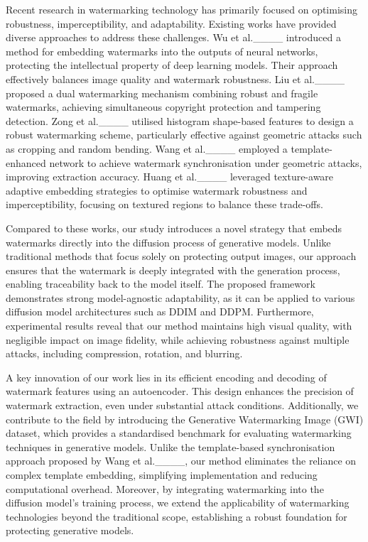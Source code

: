 Recent research in watermarking technology has primarily focused on optimising robustness, imperceptibility, and adaptability. Existing works have provided diverse approaches to address these challenges. Wu et al.____ introduced a method for embedding watermarks into the outputs of neural networks, protecting the intellectual property of deep learning models. Their approach effectively balances image quality and watermark robustness. Liu et al.____ proposed a dual watermarking mechanism combining robust and fragile watermarks, achieving simultaneous copyright protection and tampering detection. Zong et al.____ utilised histogram shape-based features to design a robust watermarking scheme, particularly effective against geometric attacks such as cropping and random bending. Wang et al.____ employed a template-enhanced network to achieve watermark synchronisation under geometric attacks, improving extraction accuracy. Huang et al.____ leveraged texture-aware adaptive embedding strategies to optimise watermark robustness and imperceptibility, focusing on textured regions to balance these trade-offs.

Compared to these works, our study introduces a novel strategy that embeds watermarks directly into the diffusion process of generative models. Unlike traditional methods that focus solely on protecting output images, our approach ensures that the watermark is deeply integrated with the generation process, enabling traceability back to the model itself. The proposed framework demonstrates strong model-agnostic adaptability, as it can be applied to various diffusion model architectures such as DDIM and DDPM. Furthermore, experimental results reveal that our method maintains high visual quality, with negligible impact on image fidelity, while achieving robustness against multiple attacks, including compression, rotation, and blurring.

A key innovation of our work lies in its efficient encoding and decoding of watermark features using an autoencoder. This design enhances the precision of watermark extraction, even under substantial attack conditions. Additionally, we contribute to the field by introducing the Generative Watermarking Image (GWI) dataset, which provides a standardised benchmark for evaluating watermarking techniques in generative models. Unlike the template-based synchronisation approach proposed by Wang et al.____, our method eliminates the reliance on complex template embedding, simplifying implementation and reducing computational overhead. Moreover, by integrating watermarking into the diffusion model's training process, we extend the applicability of watermarking technologies beyond the traditional scope, establishing a robust foundation for protecting generative models.


